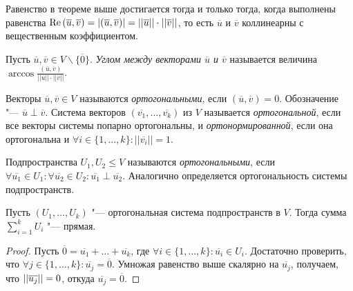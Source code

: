 \begin{note}
	Равенство в теореме выше достигается тогда и только тогда, когда выполнены равенства $\operatorname{Re}{(\overline{u}, \overline{v})} = |(\overline{u}, \overline{v})| = ||\overline{u}||\cdot||\overline{v}||$, то есть $\overline{u}$ и $\overline{v}$ коллинеарны с вещественным коэффициентом.
\end{note}

\begin{definition}
	Пусть $\overline{u}, \overline{v} \in V \backslash \{\overline0\}$. \textit{Углом между векторами $\overline{u}$ и $\overline{v}$} называется величина $\arccos{\frac{(\overline{u}, \overline{v})}{||\overline{u}||\cdot||\overline{v}||}}$.
\end{definition}

\begin{definition}
	Векторы $\overline{u}, \overline{v} \in V$ называются \textit{ортогональными}, если $(\overline{u}, \overline{v}) = 0$. Обозначение "--- $\overline{u} \perp \overline{v}$. Система векторов $(\overline{v_1}, \dots, \overline{v_k})$ из $V$ называется \textit{ортогональной}, если все векторы системы попарно ортогональны, и \textit{ортонормированной}, если она ортогональна и $\forall i \in \{1, \dots, k\}: ||\overline{v_i}|| = 1$.
\end{definition}

\begin{definition}
	Подпространства $U_1, U_2 \le V$ называются \textit{ортогональными}, если $\forall \overline{u_1} \in U_1: \forall \overline{u_2} \in U_2: \overline{u_1} \perp \overline{u_2}$. Аналогично определяется ортогональность системы подпространств.
\end{definition}

\begin{proposition}
	Пусть $(U_1, \dots, U_k)$ "--- ортогональная система подпространств в $V$. Тогда сумма $\sum_{i = 1}^kU_i$ "--- прямая.
\end{proposition}

\begin{proof}
	Пусть $\overline{0} = \overline{u_1} + \dots + \overline{u_k}$, где $\forall i \in \{1, \dotsc, k\}: \overline{u_i} \in U_i$. Достаточно проверить, что $\forall j \in \{1, \dots, k\}: \overline{u_j} = \overline{0}$. Умножая равенство выше скалярно на $\overline{u_j}$, получаем, что $||\overline{u_j}|| \hm{=} 0$, откуда $\overline{u_j} = \overline{0}$.
\end{proof}

